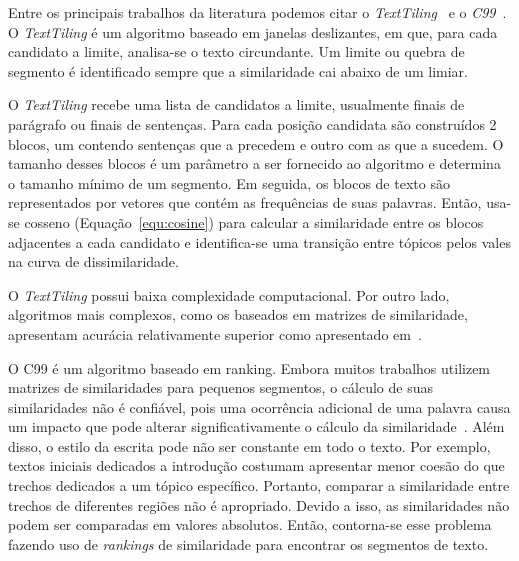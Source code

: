 Entre os principais trabalhos da literatura podemos citar o  \textit{TextTiling}~\cite{Hearst1994} e o \textit{C99}~\cite{Choi2000}.
%
O \textit{TextTiling} é um algoritmo baseado em janelas deslizantes, em  que, para cada candidato a limite, analisa-se o texto circundante. Um limite ou quebra de segmento é identificado sempre que a similaridade cai abaixo de um limiar.


O \textit{TextTiling} recebe uma lista de candidatos a limite, usualmente finais de parágrafo ou finais de sentenças. Para cada posição candidata são construídos 2 blocos, um contendo sentenças que a precedem e outro com as que a sucedem. O tamanho desses blocos é um parâmetro a ser fornecido ao algoritmo e determina o tamanho mínimo de um segmento.
%
Em seguida, os blocos de texto são representados por vetores que contém as frequências de suas palavras. Então, usa-se cosseno (Equação~\ref{equ:cosine}) para calcular a similaridade entre os blocos adjacentes a cada candidato e identifica-se uma transição entre tópicos pelos vales na curva de dissimilaridade.



O \textit{TextTiling} possui baixa complexidade computacional. Por outro lado, algoritmos mais complexos, como os baseados em matrizes de similaridade, apresentam acurácia relativamente superior como apresentado em~\cite{Choi2000, Kern2009, Misra2009}.


O C99 é um algoritmo baseado em ranking.
%
Embora muitos trabalhos utilizem matrizes de similaridades para pequenos segmentos, o cálculo de suas similaridades não é confiável, pois uma ocorrência adicional de uma palavra causa um impacto que pode alterar significativamente o cálculo da similaridade~\cite{Choi2000}.
%
Além disso, o estilo da escrita pode não ser constante em todo o texto. Por exemplo, textos iniciais dedicados a introdução costumam apresentar menor coesão do que trechos dedicados a um tópico específico. Portanto, comparar a similaridade entre trechos de diferentes regiões não é apropriado.
Devido a isso, as similaridades não podem ser comparadas em valores absolutos. Então, contorna-se esse problema fazendo uso de \textit{rankings} de similaridade para encontrar os segmentos de texto. 


